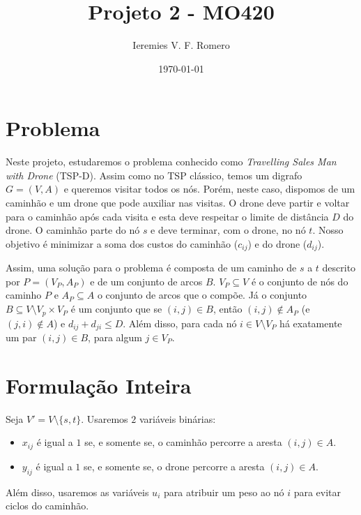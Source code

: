 \documentclass[11pt]{article}
\author{Ieremies V. F. Romero}
\date{\today}
\title{Projeto 2 - MO420}
\begin{document}
\maketitle

\section{Problema}
\label{sec:orgfc61a70}
Neste projeto, estudaremos o problema conhecido como \emph{Travelling Sales Man with Drone} (TSP-D). Assim como no TSP clássico, temos um digrafo \(G = (V,A)\) e queremos visitar todos os nós. Porém, neste caso, dispomos de um caminhão e um drone que pode auxiliar nas visitas. O drone deve partir e voltar para o caminhão após cada visita e esta deve respeitar o limite de distância \(D\) do drone. O caminhão parte do nó \(s\) e deve terminar, com o drone, no nó \(t\). Nosso objetivo é minimizar a soma dos custos do caminhão (\(c_{ij}\)) e do drone (\(d_{ij}\)).

Assim, uma solução para o problema é composta de um caminho de \(s\) a \(t\) descrito por \(P = (V_P, A_P)\) e de um conjunto de arcos \(B\). \(V_P \subseteq V\) é o conjunto de nós do caminho \(P\) e \(A_P \subseteq A\) o conjunto de arcos que o compõe. Já o conjunto \(B \subseteq V \setminus V_p \times V_P\) é um conjunto que se \((i,j) \in B\), então \((i,j) \notin A_P\) (e \((j,i) \notin A\)) e \(d_{ij} + d_{ji} \leq D\). Além disso, para cada nó \(i \in V \setminus V_P\) há exatamente um par \((i,j) \in B\), para algum \(j \in V_P\).

\section{Formulação Inteira}
\label{sec:org3c974d7}
Seja \(V' = V \setminus \{s,t\}\). Usaremos \(2\) variáveis binárias:
\begin{itemize}
\item \(x_{ij}\) é igual a \(1\) se, e somente se, o caminhão percorre a aresta \((i,j) \in A\).
\item \(y_{ij}\) é igual a \(1\) se, e somente se, o drone percorre a aresta \((i,j) \in A\).
\end{itemize}

Além disso, usaremos as variáveis \(u_i\) para atribuir um peso ao nó \(i\) para evitar ciclos do caminhão.
\end{document}
